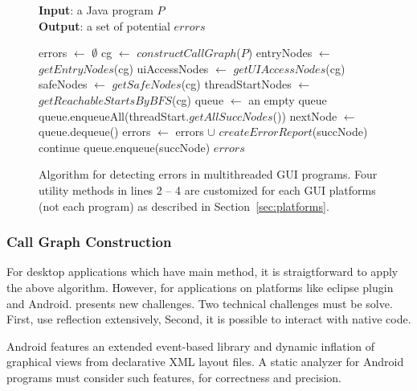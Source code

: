 \begin{figure}[t]
\textbf{Input}: a Java program $P$\\
\textbf{Output}: a set of potential $errors$\\
\vspace{-5mm}
\begin{algorithmic}[1]
\STATE errors $\leftarrow$ $\emptyset$
\STATE cg $\leftarrow$ $constructCallGraph$($P$)
\STATE entryNodes $\leftarrow$ $getEntryNodes$(cg)
\STATE uiAccessNodes $\leftarrow$ $getUIAccessNodes$(cg)
\STATE safeNodes $\leftarrow$ $getSafeNodes$(cg)
\STATE threadStartNodes $\leftarrow$ $getReachableStartsByBFS$(cg)
\STATE queue $\leftarrow$ an empty queue
\STATE queue.enqueueAll(threadStart.$getAllSuccNodes$())
\STATE nextNode $\leftarrow$ queue.dequeue()
\STATE errors $\leftarrow$ errors $\cup$ $createErrorReport$(succNode)
\STATE continue
\ELSE
\STATE queue.enqueue(succNode)
\ENDIF 
\ENDFOR
\ENDWHILE
\ENDFOR
\ENDFOR
\RETURN $errors$
\vspace{-2mm}
\end{algorithmic}
\caption{Algorithm for detecting errors in multithreaded GUI programs. 
Four utility methods in lines 2 -- 4 are customized for each GUI platforms
(not each program) as described in Section~\ref{sec:platforms}.
} \label{fig:detectalgorithm}
\end{figure}


\subsubsection{Call Graph Construction}

For desktop applications which have main method, it is straigtforward to apply
the above algorithm. However, for applications on platforms like eclipse plugin
and Android. presents new challenges. Two technical challenges must be solve.
First, use reflection extensively, Second, it is possible to interact with
native code.

Android features an extended event-based library and dynamic inflation of
graphical views from declarative XML layout files.
A static analyzer for Android programs must consider such features, for
correctness and precision.

